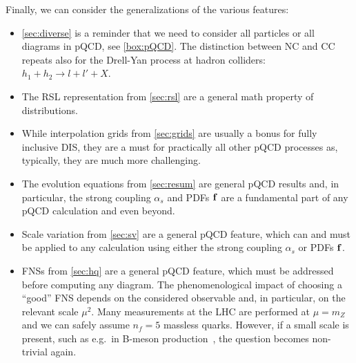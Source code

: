 Finally, we can consider the generalizations of the various features:
\begin{itemize}
    \item \cref{sec:diverse} is a reminder that we need to consider all particles or all diagrams in pQCD, see \cref{box:pQCD}.
        The distinction between NC and CC repeats also for the Drell-Yan process at hadron colliders: $h_1 + h_2 \to l + l' + X$.
    \item The RSL representation from \cref{sec:rsl} are a general math property of distributions.
    \item While interpolation grids from \cref{sec:grids} are usually a bonus for fully inclusive DIS, they are a must for practically all other pQCD processes as, typically, they are much more challenging.
    \item The evolution equations from \cref{sec:resum} are general pQCD results and, in particular, the strong coupling $\alpha_s$ and PDFs $\vb f$ are a fundamental part of any pQCD calculation and even beyond.
    \item Scale variation from \cref{sec:sv} are a general pQCD feature, which can and must be applied to any calculation using either the strong coupling $\alpha_s$ or PDFs $\vb f$.
    \item FNSs from \cref{sec:hq} are a general pQCD feature, which must be addressed before computing any diagram.
        The phenomenological impact of choosing a \enquote{good} FNS depends on the considered observable and, in particular, on the relevant scale $\mu^2$.
        Many measurements at the LHC are performed at $\mu = m_Z$ and we can safely assume $n_f=5$ massless quarks.
        However, if a small scale is present, such as e.g.\ in B-meson production~\cite{Cacciari:2012ny,Helenius:2023wkn}, the question becomes non-trivial again.
\end{itemize}

